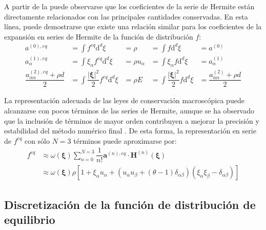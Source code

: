 A partir de la  puede observarse que los coeficientes de la serie de Hermite est\'an directamente relacionados con las principales cantidades conservadas. En esta l\'inea, puede demostrarse que existe una relaci\'on similar para los coeficientes de la expansi\'on en series de Hermite de la funci\'on de distribuci\'on $f$:
\begin{subequations}
	\begin{align}
		a^{(0),eq} &= \int f^{eq} \mbox{d}^d \xi  &= \rho  &= \int f \mbox{d}^d \xi &= a^{(0)}   \\ 
		a^{(1),eq}_{\alpha} &= \int \xi_{\alpha}f^{eq} \mbox{d}^d \xi  &= \rho u_{\alpha}  &= \int \xi_{\alpha}f \mbox{d}^d \xi &= a^{(1)}_{\alpha}   \\ 		
		\dfrac{a^{(2),eq}_{\alpha\alpha}+\rho d}{2} &= \int \dfrac{|\bm{\xi}|^2}{2} f^{eq} \mbox{d}^d \xi  &= \rho E  &= \int \dfrac{|\bm{\xi}|^2}{2} f \mbox{d}^d \xi &= \dfrac{a^{(2)}_{\alpha\alpha}+\rho d}{2}
	\end{align}
\end{subequations}

La representaci\'on adecuada de las leyes de conservaci\'on macrosc\'opica puede alcanzarse con pocos t\'erminos de las series de Hermite, aunque se ha observado que la inclusi\'on de t\'erminos de mayor orden contribuyen a mejorar la precisi\'on y estabilidad del m\'etodo num\'erico final \cite{dhumieres_multiple-relaxation-time_2002}. De esta forma, la representaci\'on en serie de $f^{eq}$ con s\'olo $N=3$ t\'erminos puede aproximarse por:
\begin{align}
	f^{eq} &\approx \omega(\bm{\xi}) \sum_{n=0}^{N=3} \dfrac{1}{n!}\bm{a}^{(n),eq} \cdot \bm{H}^{(n)}(\bm{\xi}) \\
	&\approx \omega(\bm{\xi}) \rho \left[ 1 + \xi_{\alpha}u_{\alpha} + \left( u_{\alpha}u_{\beta}+(\theta-1)\delta_{\alpha\beta} \right)\left(\xi_{\alpha}\xi_{\beta} - \delta_{\alpha\beta}\right) \right]
\end{align}


\subsection{Discretizaci\'on de la funci\'on de distribuci\'on de equilibrio}

